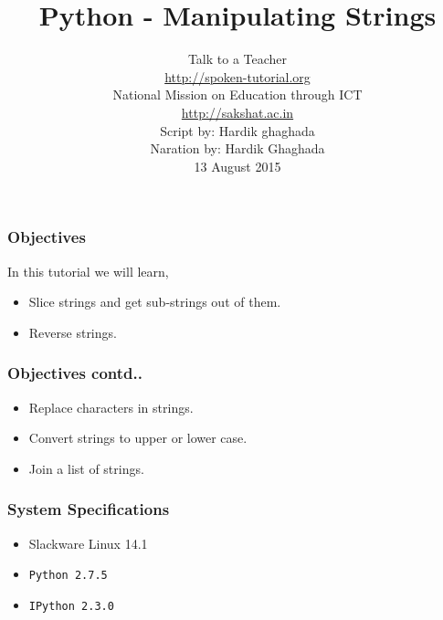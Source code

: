 \documentclass[17pt,compress]{beamer}
\author[FOSSEE]{}
\institute[IIT Bombay]{}
\date[]{}
\begin{document}
\sffamily \bfseries
\title
[Manipulating Strings]
{Python - Manipulating Strings}
\author
[FOSSEE, IIT - Bombay]
{\small Talk to a Teacher\\{\color{blue}\url{http://spoken-tutorial.org}}\\National Mission on Education
 through ICT\\{\color{blue}\url{http://sakshat.ac.in}} \\[0.5cm]{\tiny Script by: Hardik ghaghada \\ Naration by: Hardik Ghaghada \\ 13 August 2015}}

\begin{frame}
   \titlepage
\end{frame}
\begin{frame}
\frametitle{Objectives}
\label{sec-2.1}

  In this tutorial we will learn, \pause

\begin{itemize}
\item Slice strings and get sub-strings out of them.\pause
\item Reverse strings.
\end{itemize}
\end{frame}
\begin{frame}
\frametitle{Objectives contd..}
\label{sec-2.2}

\begin{itemize}
\item Replace characters in strings.\pause
\item Convert strings to upper or lower case.\pause
\item Join a list of strings.
\end{itemize}
\end{frame}
\begin{frame}
\frametitle{System Specifications}\pause
\begin{itemize}
\item Slackware Linux 14.1\pause
\item \texttt{Python 2.7.5} \pause
\item \texttt{IPython 2.3.0}
\end{itemize}
\end{frame}
\end{document}
